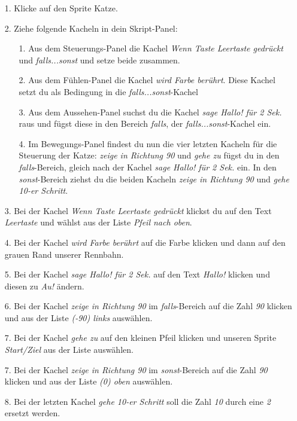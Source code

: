 \begin{itemize}
\item[1. ] Klicke auf den Sprite Katze.
\item[2. ] Ziehe folgende Kacheln in dein Skript-Panel:
  \begin{itemize}
  \item[1. ] Aus dem Steuerungs-Panel die Kachel \textit{Wenn Taste Leertaste gedrückt} und \textit{falls...sonst} und setze beide zusammen.
  \item[2. ] Aus dem Fühlen-Panel die Kachel \textit{wird Farbe berührt}. Diese Kachel setzt du als Bedingung in die \textit{falls...sonst}-Kachel
  \item[3. ] Aus dem Aussehen-Panel suchst du die Kachel \textit{sage Hallo! für 2 Sek.} raus und fügst diese in den Bereich \textit{falls}, der \textit{falls...sonst}-Kachel ein.
  \item[4. ] Im Bewegungs-Panel findest du nun die vier letzten Kacheln für die Steuerung der Katze: \textit{zeige in Richtung 90} und \textit{gehe zu} fügst du in den \textit{falls}-Bereich, gleich nach der Kachel \textit{sage Hallo! für 2 Sek.} ein. In den \textit{sonst}-Bereich ziehst du die beiden Kacheln \textit{zeige in Richtung 90} und \textit{gehe 10-er Schritt}.
  \end{itemize}
\end{itemize}

\begin{itemize}
\item[3. ] Bei der Kachel \textit{Wenn Taste Leertaste gedrückt} klickst du auf den Text \textit{Leertaste} und w{\"a}hlst aus der Liste \textit{Pfeil nach oben}.
\item[4. ] Bei der Kachel \textit{wird Farbe berührt} auf die Farbe klicken und dann auf den grauen Rand unserer Rennbahn.
\item[5. ] Bei der Kachel \textit{sage Hallo! für 2 Sek.} auf den Text \textit{Hallo!} klicken und diesen zu \textit{Au!} ändern.
\item[6. ] Bei der Kachel \textit{zeige in Richtung 90} im \textit{falls}-Bereich auf die Zahl \textit{90} klicken und aus der Liste \textit{(-90) links} auswählen.
\item[7. ] Bei der Kachel \textit{gehe zu} auf den kleinen Pfeil klicken und unseren Sprite \textit{Start/Ziel} aus der Liste auswählen.
\item[7. ] Bei der Kachel \textit{zeige in Richtung 90} im \textit{sonst}-Bereich auf die Zahl \textit{90} klicken und aus der Liste \textit{(0) oben} auswählen.
\item[8. ] Bei der letzten Kachel \textit{gehe 10-er Schritt} soll die Zahl \textit{10} durch eine \textit{2} ersetzt werden.
\end{itemize}


